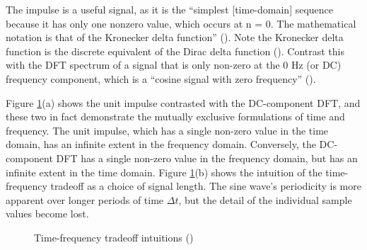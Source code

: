 \documentclass[report.tex]{subfiles}
\begin{document}
The impulse is a useful signal, as it is the ``simplest [time-domain] sequence because it has only one nonzero value, which occurs at n = 0. The mathematical notation is that of the Kronecker delta function'' (\cite[Chapter~5]{dspfirst}). Note the Kronecker delta function is the discrete equivalent of the Dirac delta function (\cite[Chapter~2]{melbook}). Contrast this with the DFT spectrum of a signal that is only non-zero at the 0 Hz (or DC) frequency component, which is a ``cosine signal with zero frequency'' (\cite[Chapter~3]{dspfirst}).

Figure \ref{fig:gaborfirst}(a) shows the unit impulse contrasted with the DC-component DFT, and these two in fact demonstrate the mutually exclusive formulations of time and frequency. The unit impulse, which has a single non-zero value in the time domain, has an infinite extent in the frequency domain. Conversely, the DC-component DFT has a single non-zero value in the frequency domain, but has an infinite extent in the time domain. Figure \ref{fig:gaborfirst}(b) shows the intuition of the time-frequency tradeoff as a choice of signal length. The sine wave's periodicity is more apparent over longer periods of time $\Delta t$, but the detail of the individual sample values become lost.

\begin{figure}[ht]
	\centering
	\hspace{2em}
	\caption{Time-frequency tradeoff intuitions (\cite{gabor2})}
	\label{fig:gaborfirst}
\end{figure}
\end{document}

